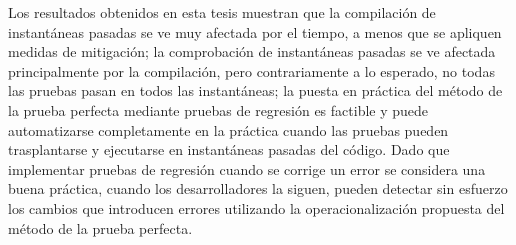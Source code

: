 Los resultados obtenidos en esta tesis muestran que la compilación de instantáneas pasadas se ve muy afectada por el tiempo, a menos que se apliquen medidas de mitigación; 
la comprobación de instantáneas pasadas se ve afectada principalmente por la compilación, pero contrariamente a lo esperado, no todas las pruebas pasan en todos las instantáneas;
la puesta en práctica del método de la prueba perfecta mediante pruebas de regresión es factible y puede automatizarse completamente en la práctica cuando las pruebas pueden trasplantarse y ejecutarse en instantáneas pasadas del código.
Dado que implementar pruebas de regresión cuando se corrige un error se considera una buena práctica, cuando los desarrolladores la siguen, pueden detectar sin esfuerzo los cambios que introducen errores utilizando la operacionalización propuesta del método de la prueba perfecta.